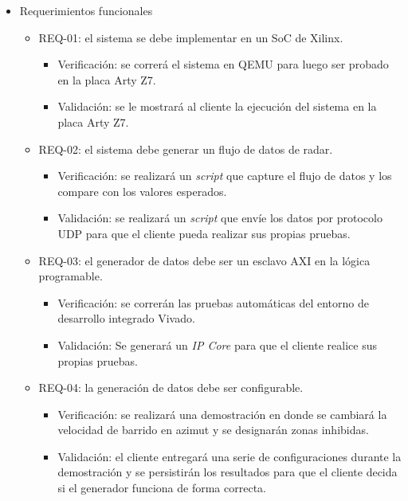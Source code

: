 \documentclass[
11pt, %
]{charter}
\begin{document}
\begin{itemize}
	\item Requerimientos funcionales
		\begin{itemize}
      \item REQ-01: el sistema se debe implementar en un SoC de Xilinx.
        \begin{itemize}
          \item Verificación: se correrá el sistema en QEMU para luego ser probado
          en la placa Arty Z7. 
          \item Validación: se le mostrará al cliente la ejecución del sistema en
          la placa Arty Z7.  
        \end{itemize}
      \item REQ-02: el sistema debe generar un flujo de datos de radar.
        \begin{itemize}
          \item Verificación: se realizará un \emph{script} que capture el flujo
            de datos y los compare con los valores esperados.
          \item Validación: se realizará un \emph{script} que envíe los datos
            por protocolo UDP para que el cliente pueda realizar sus propias
            pruebas.
        \end{itemize}
      \item REQ-03: el generador de datos debe ser un esclavo AXI en la lógica
        programable.
        \begin{itemize}
          \item Verificación: se correrán las pruebas automáticas del entorno de
            desarrollo integrado Vivado.
          \item Validación: Se generará un \emph{IP Core} para que el cliente
            realice sus propias pruebas.
        \end{itemize}
			\item REQ-04: la generación de datos debe ser configurable.
        \begin{itemize}
          \item Verificación: se realizará una demostración en donde se cambiará
            la velocidad de barrido en azimut y se designarán zonas inhibidas.
          \item Validación: el cliente entregará una serie de configuraciones
            durante la demostración y se persistirán los resultados para que el
            cliente decida si el generador funciona de forma correcta.
        \end{itemize}

\end{itemize}
\end{itemize}
\end{document}
